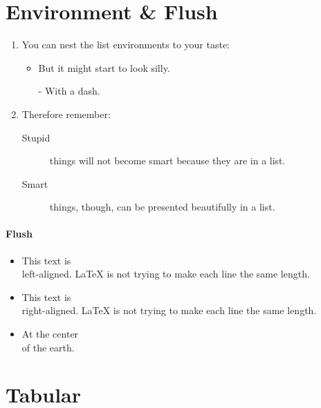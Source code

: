\documentclass[a4paper,11pt]{article}
\begin{document}
\pagebreak
\section{Environment \& Flush}
\flushleft
\begin{enumerate}
	\item You can nest the list
	environments to your taste:
	\begin{itemize}
		\item But it might start to
		look silly.
		\item[-] With a dash.

	\end{itemize}
	\item Therefore remember:
	\begin{description}
		\item[Stupid] things will not
		become smart because they are
		in a list.
		\item[Smart] things, though,
		can be presented beautifully
		in a list.
	\end{description}
\end{enumerate}

\paragraph{Flush}
\begin{itemize}
	\item \begin{flushleft}
		This text is\\ left-aligned.
		\LaTeX{} is not trying to make
		each line the same length.
	\end{flushleft}
	\item \begin{flushright}
		This text is\\ right-aligned.
		\LaTeX{} is not trying to make
		each line the same length.
	\end{flushright}
	\item \begin{center}
		At the center \\ of the earth.
	\end{center}
\end{itemize}
\pagebreak
\section{Tabular}
\end{document}
